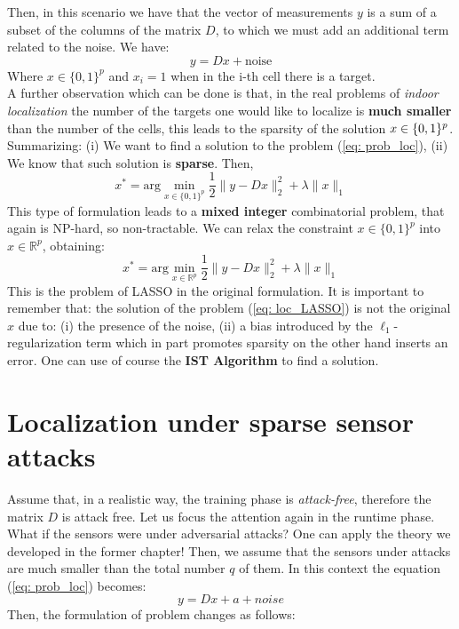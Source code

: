 Then, in this scenario we have that the vector of measurements $y$ is a sum of a subset of the columns of the matrix $D$, to which we must add an additional term related to the noise. We have: 
\begin{equation} \label{eq: prob_loc}
	y=Dx+\text{noise}
\end{equation}
Where $x\in\{0,1\}^p$ and $x_i=1$ when in the i-th cell there is a target. \\
A further observation which can be done is that, in the real problems of \textit{indoor localization} the number of the targets one would like to localize is \textbf{much smaller} than the number of the cells, this leads to the sparsity of the solution $x\in\mathbb\{0,1\}^p$. 
Summarizing: (i) We want to find a solution to the problem (\ref{eq: prob_loc}), (ii) We know that such solution is \textbf{sparse}. Then,
\begin{equation}
	x^*=\text{arg}\min_{x\in\{0,1\}^p} \frac{1}{2} \lVert y-Dx \rVert_2^2 + \lambda \lVert x \rVert_1
 \end{equation}
This type of formulation leads to a \textbf{mixed integer} combinatorial problem, that again is NP-hard, so non-tractable. We can relax the constraint $x\in\{0,1\}^p$ into $x\in\mathbb{R}^p$, obtaining:
\begin{equation} \label{eq: loc_LASSO}
	x^*=\text{arg}\min_{x\in\mathbb{R}^p} \frac{1}{2} \lVert y-Dx \rVert_2^2 + \lambda \lVert x \rVert_1
\end{equation}
This is the problem of LASSO in the original formulation. {\color{red} It is important to remember that: } the solution of the problem (\ref{eq: loc_LASSO}) is not the original $x$ due to: (i) the presence of the noise, (ii) a bias introduced by the $\ell_1$-regularization term which in part promotes sparsity on the other hand inserts an error. One can use of course the \textbf{IST Algorithm} to find a solution.

\section{Localization under sparse sensor attacks}
\noindent
Assume that, in a realistic way, the training phase is \textit{attack-free}, therefore the matrix $D$ is attack free. Let us focus the attention again in the runtime phase.\\
What if the sensors were under adversarial attacks? One can apply the theory we developed in the former chapter! Then, we assume that the sensors under attacks are much smaller than the total number $q$ of them. In this context the equation (\ref{eq: prob_loc}) becomes: 
\begin{equation}
	y=Dx+a+noise	
\end{equation}
Then, the formulation of problem changes as follows:\\



